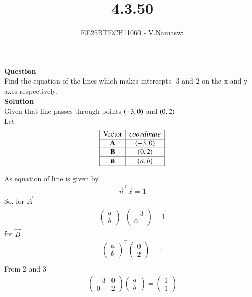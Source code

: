 \documentclass[journal]{IEEEtran}
\begin{document}

\vspace{3cm}

\title{4.3.50}
\author{EE25BTECH11060 - V.Namaswi}
{\let\newpage\relax\maketitle}
\renewcommand{\thefigure}{\theenumi}
\renewcommand{\thetable}{\theenumi}
\setlength{\intextsep}{10pt} %
\textbf{Question}\\ Find the equation of the lines which makes intercepts -3 and 2 on the x and y axes respectively.\\
\textbf{Solution}\\
Given that line passes through points $\left(-3,0\right)$ and $\left(0,2\right)$ \\
Let
\[
\begin{array}{|c|c|}
\hline
\text{Vector} & coordinate \\ \hline
\Vec{A} & (-3, 0) \\ \hline
\Vec{B} & (0, 2) \\ \hline
\vec{n} & (a, b) \\ \hline
\end{array}
\]

As equation of line is given by 
\begin{align}
    \vec{n}^\top \vec{x}=1
\end{align}
 So, for $\vec{A}$ 
 \begin{align}
 \begin{pmatrix}
     a \\ b 
 \end{pmatrix}^\top\begin{pmatrix}
     -3  \\ 0
 \end{pmatrix}=1
  \end{align}
  for $\vec{B}$
 \begin{align}
 \begin{pmatrix}
     a \\ b 
 \end{pmatrix}^\top\begin{pmatrix}
     0  \\  2
 \end{pmatrix}=1\\
 \end{align}
 From 2 and 3\\
 \begin{align}
 \begin{pmatrix}
     -3 & 0 \\
     0 & 2 
 \end{pmatrix}\begin{pmatrix}
     a \\ b 
 \end{pmatrix}=\begin{pmatrix}
     1 \\ 1
 \end{pmatrix}
 \end{align}
\end{document}
